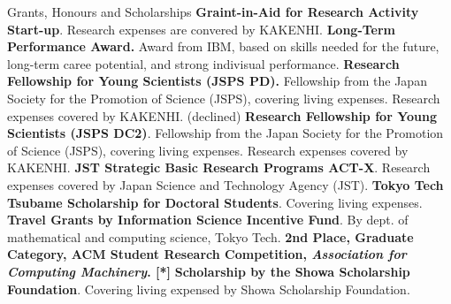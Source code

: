 \begin{rubric}{Grants, Honours and Scholarships}
  \entry*[2024] \textbf{Graint-in-Aid for Research Activity Start-up}. Research expenses are convered by KAKENHI.
  \entry*[2023] \textbf{Long-Term Performance Award.}
  Award from IBM, based on skills needed for the future, long-term caree potential, and strong indivisual performance.
  \entry*[2023] \textbf{Research Fellowship for Young Scientists (JSPS PD).}
  Fellowship from the Japan Society for the Promotion of Science (JSPS), covering
  living expenses. Research expenses covered by KAKENHI. (declined)
  \entry*[2021] \textbf{Research Fellowship for Young Scientists (JSPS DC2)}.
  Fellowship from the Japan Society for the Promotion of Science (JSPS), covering
  living expenses. Research expenses covered by KAKENHI.
  \entry*[2020] \textbf{JST Strategic Basic Research Programs ACT-X}. Research
  expenses covered by Japan Science and Technology Agency (JST).
  \entry*[2020] \textbf{Tokyo Tech Tsubame Scholarship for Doctoral
    Students}. Covering living expenses.
  \entry*[2019] \textbf{Travel Grants by Information Science Incentive Fund}. By
  dept. of mathematical and computing science, Tokyo Tech.
  \entry*[2019] \textbf{2nd Place, Graduate Category, ACM Student Research
    Competition, \textit{Association for Computing Machinery}. [*]}
  \entry*[2014] \textbf{Scholarship by the Showa Scholarship Foundation}. Covering
  living expensed by Showa Scholarship Foundation.
\end{rubric}
